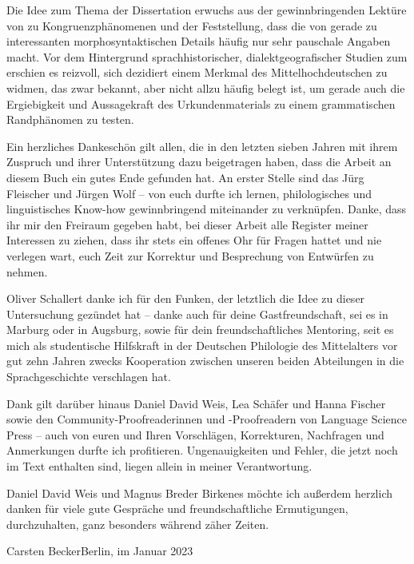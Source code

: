 Die Idee zum Thema der Dissertation erwuchs aus der gewinnbringenden Lektüre
von \citet{corbett2006} zu Kongruenz\-phänomenen und der Feststellung, dass die
 von \citet{paul2007} gerade zu interessanten
morpho\-syntaktischen Details häufig nur sehr pauschale Angaben macht. Vor dem
Hintergrund sprach\-historischer, dialekt\-geografischer Studien zum \CAO{}
\autocite{beckerschallert2021,beckerschallert2022a, beckerschallert2022b}
erschien es reizvoll, sich dezidiert einem Merkmal des Mittelhochdeutschen zu
widmen, das zwar bekannt, aber nicht allzu häufig belegt ist, um gerade auch
die Ergiebigkeit und Aussagekraft des Urkunden\-materials zu einem
grammatischen Randphänomen zu testen.

Ein herzliches Dankeschön gilt allen, die in den letzten sieben Jahren mit
ihrem Zuspruch und ihrer Unterstützung dazu beigetragen haben, dass die Arbeit
an diesem Buch ein gutes Ende gefunden hat. An erster Stelle sind das Jürg
Fleischer und Jürgen Wolf -- von euch durfte ich lernen, philologisches und
linguistisches Know-how gewinnbringend miteinander zu verknüpfen. Danke, dass
ihr mir den Freiraum gegeben habt, bei dieser Arbeit alle Register meiner
Interessen zu ziehen, dass ihr stets ein offenes Ohr für Fragen hattet und nie
verlegen wart, euch Zeit zur Korrektur und Besprechung von Entwürfen zu nehmen.

Oliver Schallert danke ich für den Funken, der letztlich die Idee zu dieser
Untersuchung gezündet hat -- danke auch für deine Gastfreundschaft, sei es in
Marburg oder in Augsburg, sowie für dein freundschaftliches Mentoring, seit es
mich als studentische Hilfskraft in der Deutschen Philologie des Mittelalters
vor gut zehn Jahren zwecks Kooperation zwischen unseren beiden Abteilungen in
die Sprachgeschichte verschlagen hat.

Dank gilt darüber hinaus Daniel David Weis, Lea Schäfer und Hanna Fischer sowie
den Community-Proofreaderinnen und -Proofreadern von Language Science Press --
auch von euren und Ihren Vorschlägen, Korrekturen, Nachfragen und Anmerkungen
durfte ich profitieren. Ungenauigkeiten und Fehler, die jetzt noch im Text
enthalten sind, liegen allein in meiner Verantwortung.

\begin{sloppypar}
Daniel David Weis und Magnus Breder Birkenes möchte ich außerdem herzlich
danken für viele gute Gespräche und freundschaftliche Ermutigungen,
durchzuhalten, ganz besonders während zäher Zeiten.
\end{sloppypar}
\bigskip

\noindent%
Carsten Becker\hfill Berlin, im Januar 2023
